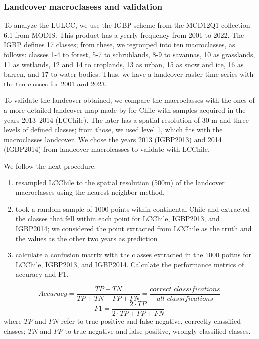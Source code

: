\documentclass[
  authoryear,
  preprint,
  3p,
  onecolumn]{elsarticle}
\providecommand{\tightlist}{%
  \setlength{\itemsep}{0pt}\setlength{\parskip}{0pt}}\usepackage{longtable,booktabs,array}
\begin{document}
\hypertarget{landcover-macroclasess-and-validation}{%
\subsubsection{Landcover macroclasess and
validation}\label{landcover-macroclasess-and-validation}}

To analyze the LULCC, we use the IGBP scheme from the MCD12Q1 collection
6.1 from MODIS. This product has a yearly frequency from 2001 to 2022.
The IGBP defines 17 classes; from these, we regrouped into ten
macroclasses, as follows: classes 1-4 to forest, 5-7 to schrublands, 8-9
to savannas, 10 as grasslands, 11 as wetlands, 12 and 14 to croplands,
13 as urban, 15 as snow and ice, 16 as barren, and 17 to water bodies.
Thus, we have a landcover raster time-series with the ten classes for
2001 and 2023.

To validate the landcover obtained, we compare the macroclasses with the
ones of a more detailed landcover map made by \citet{Zhao2016} for Chile
with samples acquired in the years 2013--2014 (LCChile). The later has a
spatial resolution of 30 m and three levels of defined classes; from
those, we used level 1, which fits with the macroclasses landcover. We
chose the years 2013 (IGBP2013) and 2014 (IGBP2014) from landcover
macrolcasses to validate with LCChile.

We follow the next procedure:

\begin{enumerate}
\def\labelenumi{\roman{enumi})}
\tightlist
\item
  resampled LCChile to the spatial resolution (500m) of the landcover
  macroclasses using the nearest neighbor method,
\item
  took a random sample of 1000 points within continental Chile and
  extracted the classes that fell within each point for LCChile,
  IGBP2013, and IGBP2014; we considered the point extracted from LCChile
  as the truth and the values as the other two years as prediction
\item
  calculate a confusion matrix with the classes extracted in the 1000
  poitns for LCChile, IGBP2013, and IGBP2014. Calculate the performance
  metrics of accuracy and F1.
\end{enumerate}

\[Accuracy = \frac{TP+TN}{TP+TN+FP+FN}=\frac{correct\,\, classifications}{all\,\, classifications}\]
\[F1=\frac{2\cdot TP}{2\cdot TP + FP +FN}\] where \(TP\) and \(FN\)
refer to true positive and false negative, correctly classified classes;
\(TN\) and \(FP\) to true negative and false positive, wrongly
classified classes.
\end{document}
